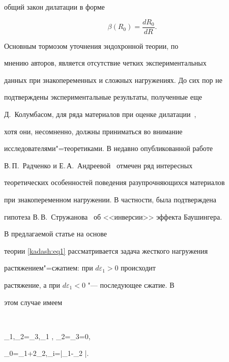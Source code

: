 общий закон дилатации в форме

\begin{equation}

\label{kadash:eq4}

\beta(R_0)=\frac{dR_0}{dR}.

\end{equation}



\noindent  Основным тормозом  уточнения эндохронной теории, по

мнению авторов, является отсутствие четких экспериментальных

данных при знакопеременных и сложных нагружениях. До сих пор не

подтверждены экспериментальные результаты, полученные еще

Д.~Колумбасом, для ряда материалов при оценке дилатации~\cite{Columbas-1, Columbas-2},

хотя они, несомненно, должны приниматься во внимание

исследователями"=теоретиками. В недавно опубликованной работе

В.\,П.~Радченко и Е.\,А.~Андреевой~\cite{Radchenko} отмечен ряд интересных

теоретических особенностей поведения разупрочняющихся материалов

при знакопеременном нагружении. В частности, была подтверждена

гипотеза В.\,В.~Стружанова~\cite{Struzhanov-2006a} об <<инверсии>> эффекта Баушингера.



\smallskip




В предлагаемой статье на основе

теории \eqref{kadash:eq1} рассматривается задача жесткого нагружения

растяжением"=сжатием: при $d \varepsilon_1>0 $ происходит

растяжение, а при $d\varepsilon_1<0$ "--- последующее сжатие. В

этом случае имеем

$$

\varepsilon_1,\quad \varepsilon_2=\varepsilon_3,\quad \sigma_1 , \quad \sigma_2=\sigma_3=0,

\quad \varepsilon_0=\varepsilon_1+2\varepsilon_2,\quad \varepsilon_i=|\varepsilon_1-\varepsilon_2 |.

